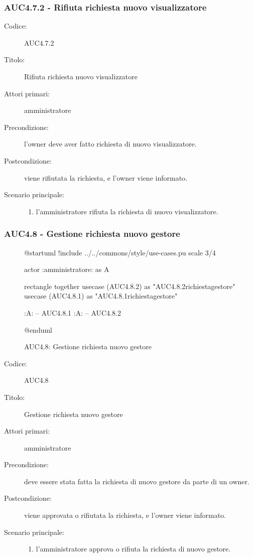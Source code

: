 \documentclass[casi-duso]{subfiles}
\begin{document}
\subsubsection{AUC4.7.2 - Rifiuta richiesta nuovo visualizzatore}%
\label{subsub:AUC4.7.2}
\begin{description}
  \item[Codice:] AUC4.7.2
  \item[Titolo:] Rifiuta richiesta nuovo visualizzatore
  \item[Attori primari:] amministratore
  \item[Precondizione:] l'owner deve aver fatto richiesta di nuovo visualizzatore.
  \item[Postcondizione:] viene rifiutata la richiesta, e l'owner viene informato.
  \item[Scenario principale:]
  \begin{enumerate}
    \item l'amministratore rifiuta la richiesta di nuovo visualizzatore.
  \end{enumerate}
\end{description}  

\subsubsection{AUC4.8 - Gestione richiesta nuovo gestore}%
\label{subsub:AUC4.8}

\begin{figure}[h!] 
  \centering 
  \begin{plantuml}
  @startuml
  !include ../../commons/style/use-cases.pu
  scale 3/4

  actor :amministratore: as A

  rectangle {
    together {
      usecase (AUC4.8.2) as "AUC4.8.2\nRifiuta richiesta\nnuovo gestore"
      usecase (AUC4.8.1) as "AUC4.8.1\nAccetta richiesta\nnuovo gestore"
    }
  }

  :A: -- AUC4.8.1
  :A: -- AUC4.8.2

  @enduml
  \end{plantuml} 
  \caption{AUC4.8: Gestione richiesta nuovo gestore} 
  \label{fig:auc4_8} 
\end{figure}

\begin{description}
  \item[Codice:] AUC4.8
  \item[Titolo:] Gestione richiesta nuovo gestore
  \item[Attori primari:] amministratore
  \item[Precondizione:] deve essere stata fatta la richiesta di nuovo gestore da parte di un owner.
  \item[Postcondizione:] viene approvata o rifiutata la richiesta, e l'owner viene informato.
  \item[Scenario principale:]
  \begin{enumerate}
    \item l'amministratore approva o rifiuta la richiesta di nuovo gestore.
  \end{enumerate}
\end{description}
\end{document}
